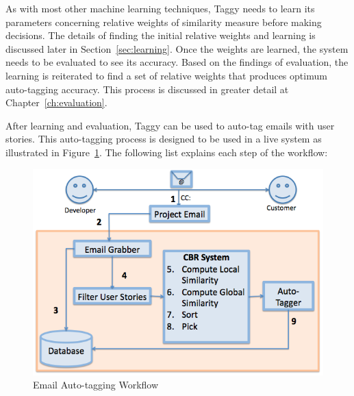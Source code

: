 As with most other machine learning techniques, Taggy needs to learn its parameters concerning relative weights of similarity measure before making decisions. The details of finding the initial relative weights and learning is discussed later in Section~\ref{sec:learning}. Once the weights are learned, the system needs to be evaluated to see its accuracy. Based on the findings of evaluation, the learning is reiterated to find a set of relative weights that produces optimum auto-tagging accuracy. This process is discussed in greater detail at Chapter~\ref{ch:evaluation}.

After learning and evaluation, Taggy can be used to auto-tag emails with user stories. This auto-tagging process is designed to be used in a live system as illustrated in Figure~\ref{fig:workflow}. The following list explains each step of the workflow: 
\begin{figure}[!h]
	\centering
	\includegraphics[width=\textwidth]{workflow.png}
	\caption{Email Auto-tagging Workflow}
	\label{fig:workflow}
\end{figure}

